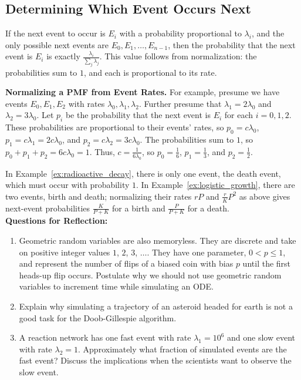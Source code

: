 \subsection{Determining Which Event Occurs Next}\label{subsec:which_event}



If the next event to occur is $E_i$ with a probability proportional to $\lambda_i$, and the only possible next events are $E_0, E_1, \ldots, E_{n-1}$, then the probability that the next event is $E_i$ is exactly $\frac{\lambda_i}{\sum_j \lambda_j}$. This value follows from normalization: the probabilities sum to $1$, and each is proportional to its rate.

\begin{example}\label{ex:normalize_pmf}
\textbf{Normalizing a PMF from Event Rates.}
For example, presume we have events $E_0, E_1, E_2$ with rates $\lambda_0, \lambda_1, \lambda_2$. Further presume that $\lambda_1 = 2\lambda_0$ and $\lambda_2 = 3 \lambda_0$. Let $p_i$ be the probability that the next event is $E_i$ for each $i=0,1,2$. These probabilities are proportional to their events' rates, so $p_0 = c \lambda_0$, $p_1 = c \lambda_1 = 2c\lambda_0$, and $p_2 = c \lambda_2 = 3c\lambda_0$. The probabilities sum to $1$, so $p_0 + p_1 + p_2 = 6c\lambda_0 = 1$. Thus, $c = \frac{1}{6\lambda_0}$, so $p_0 = \frac{1}{6}$, $p_1 = \frac{1}{3}$, and $p_2 = \frac{1}{2}$.
\end{example}

In Example~\ref{ex:radioactive_decay}, there is only one event, the death event, which must occur with probability $1$. In Example~\ref{ex:logistic_growth}, there are two events, birth and death; normalizing their rates $rP$ and $\frac{r}{K}P^2$ as above gives next-event probabilities $\frac{K}{P+K}$ for a birth and $\frac{P}{P+K}$ for a death.\\

\noindent \textup{{\bf Questions for Reflection:}}
\begin{enumerate}
\item Geometric random variables are also memoryless. They are discrete and take on positive integer values $1$, $2$, $3$, $\ldots$. They have one parameter, $0 < p \leq 1$, and represent the number of flips of a biased coin with bias $p$ until the first heads-up flip occurs. Postulate why we should not use geometric random variables to increment time while simulating an ODE.


\item Explain why simulating a trajectory of an asteroid headed for earth is not a good task for the Doob-Gillespie algorithm.

\item A reaction network has one fast event with rate $\lambda_1 = 10^6$ and one slow event with rate $\lambda_2 = 1$. Approximately what fraction of simulated events are the fast event? Discuss the implications when the scientists want to observe the slow event.
\end{enumerate}
